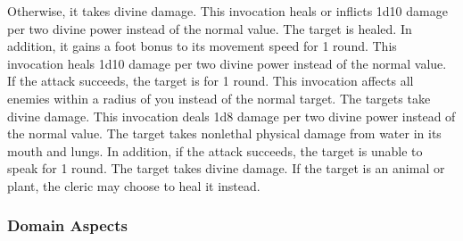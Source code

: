             Otherwise, it takes divine damage.
            This invocation heals or inflicts 1d10 damage per two divine power instead of the normal value.
            The target is healed.
            In addition, it gains a  foot bonus to its movement speed for 1 round.
            This invocation heals 1d10 damage per two divine power instead of the normal value.
            If the attack succeeds, the target is \disoriented for 1 round.
            This invocation affects all enemies within a \areasmall radius of you instead of the normal target.
            The targets take divine damage.
            This invocation deals 1d8 damage per two divine power instead of the normal value.
            The target takes nonlethal physical damage from water in its mouth and lungs.
            In addition, if the attack succeeds, the target is unable to speak for 1 round.
            The target takes divine damage.
            If the target is an animal or plant, the cleric may choose to heal it instead.

        \subsubsection{Domain Aspects}\label{Domain Aspects}

